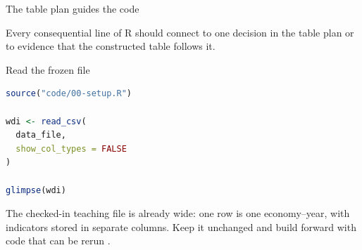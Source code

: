 \begin{frame}{The table plan guides the code}
  \begin{center}
  \end{center}

  \vfill
  Every consequential line of R should connect to one decision in the table
  plan or to evidence that the constructed table follows it.
\end{frame}

\begin{frame}[fragile]{Read the frozen file}
\begin{lstlisting}[language=R]
source("code/00-setup.R")

wdi <- read_csv(
  data_file,
  show_col_types = FALSE
)

glimpse(wdi)
\end{lstlisting}

  The checked-in teaching file is already wide: one row is one economy--year,
  with indicators stored in separate columns. Keep it unchanged and build
  forward with code that can be rerun \citep{wickham2023r4ds}.
\end{frame}

